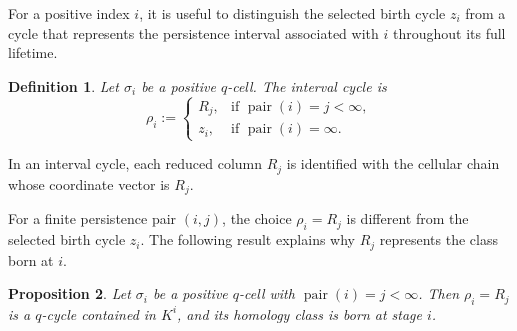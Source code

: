 \documentclass[11pt]{article}
\theoremstyle{paperdefinition}
\newtheorem{definition}{Definition}[section]
\theoremstyle{paperplain}
\newtheorem{proposition}[definition]{Proposition}
\theoremstyle{paperremark}
\begin{document}
For a positive index $i$, it is useful to distinguish the selected birth cycle $z_i$ from a cycle that represents the persistence interval associated with $i$ throughout its full lifetime. 

\begin{definition}
\label{def:interval-cycle}
Let $\sigma_i$ be a positive $q$-cell. The \emph{interval cycle} is
\begin{equation}
\label{eq:interval-cycle}
\rho_i :=
\begin{cases}
R_j, & \text{if }\operatorname{pair}(i)=j<\infty,\\
z_i, & \text{if }\operatorname{pair}(i)=\infty.
\end{cases}
\end{equation}
\end{definition}

In an interval cycle, each reduced column $R_j$ is identified with the cellular chain whose coordinate vector is $R_j$.

For a finite persistence pair $(i,j)$, the choice $\rho_i=R_j$ is different from the selected birth cycle $z_i$. The following result explains why $R_j$ represents the class born at $i$.

\begin{proposition}
\label{prop:interval-cycle-birth}
Let $\sigma_i$ be a positive $q$-cell with $\operatorname{pair}(i)=j<\infty$. Then $\rho_i=R_j$ is a $q$-cycle contained in $K^i$, and its homology class is born at stage $i$.
\end{proposition}
\end{document}
